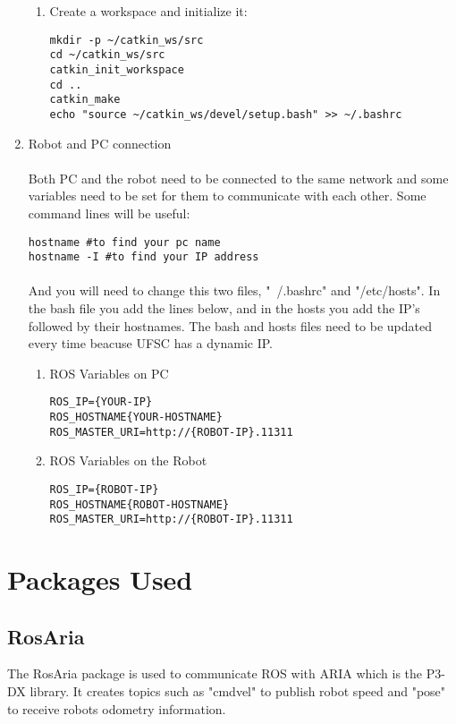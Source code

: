 \documentclass{article}
\begin{document}
\begin{enumerate}
\begin{enumerate}
\item Create a workspace and initialize it:
\begin{lstlisting}
mkdir -p ~/catkin_ws/src
cd ~/catkin_ws/src
catkin_init_workspace
cd ..
catkin_make
echo "source ~/catkin_ws/devel/setup.bash" >> ~/.bashrc
\end{lstlisting}
\end{enumerate}

\item Robot and PC connection
\paragraph{}
Both PC and the robot need to be connected to the same network and some variables
need to be set for them to communicate with each other. Some command lines will
be useful:
\begin{lstlisting}
hostname #to find your pc name
hostname -I #to find your IP address
\end{lstlisting}

\paragraph{}
And you will need to change this two files, "~/.bashrc" and "/etc/hosts".
In the bash file you add the lines below, and in the hosts you add the IP's
followed by their hostnames. The bash and hosts files need to be updated every
time beacuse UFSC has a dynamic IP.
\begin{enumerate}

\item ROS Variables on PC
\begin{lstlisting}
ROS_IP={YOUR-IP}
ROS_HOSTNAME{YOUR-HOSTNAME}
ROS_MASTER_URI=http://{ROBOT-IP}.11311
\end{lstlisting}

\item ROS Variables on the Robot
\begin{lstlisting}
ROS_IP={ROBOT-IP}
ROS_HOSTNAME{ROBOT-HOSTNAME}
ROS_MASTER_URI=http://{ROBOT-IP}.11311
\end{lstlisting}
\end{enumerate}
\end{enumerate}

\section{Packages Used}
\subsection{RosAria}
The RosAria package is used to communicate ROS with ARIA which is the P3-DX
library. It creates topics such as "cmdvel" to publish robot speed and "pose"
to receive robots odometry information.
\end{document}
